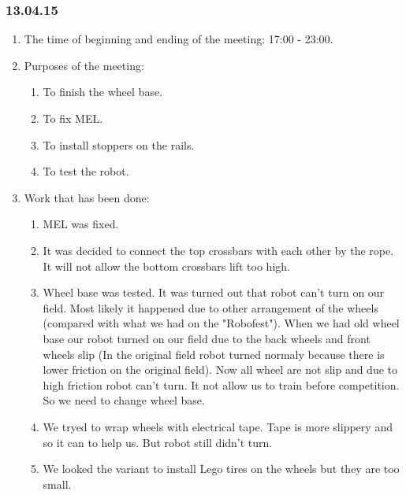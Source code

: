 \subsubsection{13.04.15}
\begin{enumerate}
	
	\item The time of beginning and ending of the meeting: 17:00 - 23:00.
	
	\item Purposes of the meeting: 
	\begin{enumerate}
		
		\item To finish the wheel base.
		
		\item To fix MEL.
		
		\item To install stoppers on the rails.
		
		\item To test the robot.
		
	\end{enumerate}
	
	\item Work that has been done:
	\begin{enumerate}
				
		\item MEL was fixed.
		
		\item It was decided to connect the top crossbars with each other by the rope. It will not allow the bottom crossbars lift too high.
		
		\item Wheel base was tested. It was turned out that robot can't turn on our field. Most likely it happened due to other arrangement of the wheels (compared with what we had on the "Robofest"). When we had old wheel base our robot turned on our field due to the back wheels and front wheels slip (In the original field robot turned normaly because there is lower friction on the original field). Now all wheel are not slip and due to high friction robot can't turn. It not allow us to train before competition. So we need to change wheel base.
		
		\item We tryed to wrap wheels with electrical tape. Tape is more slippery and so it can to help us. But robot still didn't turn.
		
		\item We looked the variant to install Lego tires on the wheels but they are too small.
		

\end{enumerate}
\end{enumerate}
